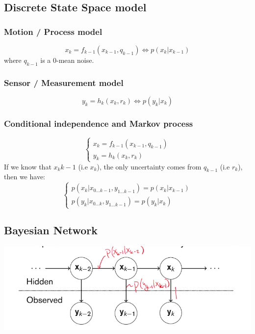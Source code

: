 \subsection{Discrete State Space model}
\subsubsection{Motion / Process model}
\begin{equation}
    x_k = f_{k-1}(x_{k-1}, q_{k-1}) \Leftrightarrow p(x_k | x_{k-1}) 
\end{equation}
where $q_{k-1}$ is a 0-mean noise.

\subsubsection{Sensor / Measurement model}
\begin{equation}
    y_k = h_k(x_k, r_k) \Leftrightarrow p(y_k | x_k)
\end{equation}

\subsubsection{Conditional independence and Markov process}
\begin{equation}
    \left\{\begin{array}{c}
        x_k = f_{k-1}(x_{k-1}, q_{k-1}) \\
        y_k = h_k(x_k, r_k)
    \end{array}\right.
\end{equation}
If we know that $x_k{k-1}$ (i.e $x_k$), the only uncertainty comes from $q_{k-1}$ (i.e $r_k$), then we have:
\begin{equation}
    \left\{\begin{array}{c}
        p(x_k|x_{0\dots k-1}, y_{1\dots k-1}) = p(x_k|x_{k-1}) \\
        p(y_k|x_{0\dots k}, y_{1 \dots k-1}) = p(y_k | x_k) 
    \end{array}
    \right.
\end{equation}

\subsection{Bayesian Network}
\includegraphics[scale=0.5]{content/Bayesian_Network.png}


